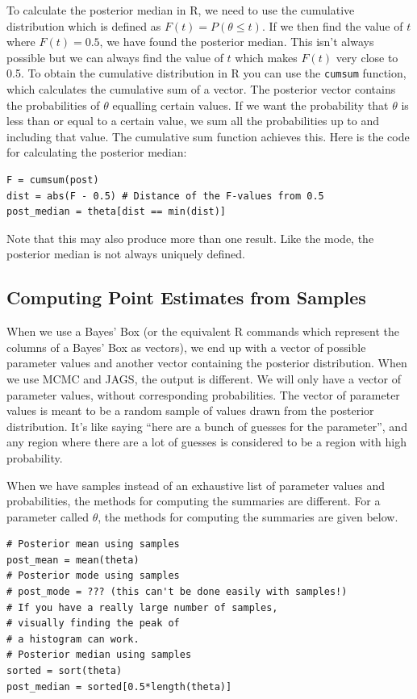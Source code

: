 To calculate the posterior median in R, we need to use the cumulative distribution
which is defined as $F(t) = P(\theta \leq t)$. If we then find the value of $t$
where $F(t) = 0.5$, we have found the posterior median. This isn't always
possible but we can always find the value of $t$ which makes $F(t)$ very close to
0.5.
To obtain the cumulative distribution
in R you can use the {\tt cumsum} function, which calculates the cumulative sum
of a vector. The posterior vector contains the probabilities of $\theta$ equalling
certain values. If we want the probability that $\theta$ is less than or
equal to a certain value, we sum all the probabilities up to and including that value. The
cumulative sum function achieves this. Here is the code for calculating the
posterior median:
\begin{framed}
\begin{verbatim}
F = cumsum(post)
dist = abs(F - 0.5) # Distance of the F-values from 0.5
post_median = theta[dist == min(dist)]
\end{verbatim}
\end{framed}
Note that this may also produce more than one result. Like the mode, the
posterior median is not always uniquely defined.

\subsection{Computing Point Estimates from Samples}
When we use a Bayes' Box (or the equivalent R commands which represent the
columns of a Bayes' Box as vectors), we end up with a vector of possible parameter
values and another vector containing the posterior distribution.
When we use MCMC and JAGS, the output is different.
We will only have a vector of parameter
values, without corresponding probabilities. The vector of parameter values is
meant to be a random sample of values drawn from the posterior distribution.
It's like saying ``here are a bunch of guesses for the parameter'', and any
region where there are a lot of guesses is considered to be a region with high
probability.

When we have samples instead of an exhaustive list of parameter values and
probabilities, the methods for computing the summaries are different. For a
parameter called $\theta$, the methods for computing the summaries are given
below.

\begin{framed}
\begin{verbatim}
# Posterior mean using samples
post_mean = mean(theta)
# Posterior mode using samples
# post_mode = ??? (this can't be done easily with samples!)
# If you have a really large number of samples,
# visually finding the peak of
# a histogram can work.
# Posterior median using samples
sorted = sort(theta)
post_median = sorted[0.5*length(theta)]
\end{verbatim}
\end{framed}


